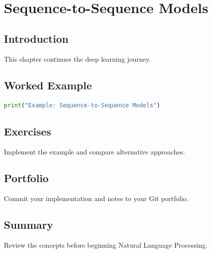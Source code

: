 \chapter{Sequence-to-Sequence Models}
\label{chap:vol7-14}



\section{Introduction}
This chapter continues the deep learning journey.

\section{Worked Example}
\begin{lstlisting}[language=Python]
print("Example: Sequence-to-Sequence Models")
\end{lstlisting}

\section{Exercises}
\begin{exercise}
Implement the example and compare alternative approaches.
\end{exercise}

\section{Portfolio}
Commit your implementation and notes to your Git portfolio.

\section{Summary}
Review the concepts before beginning Natural Language Processing.
